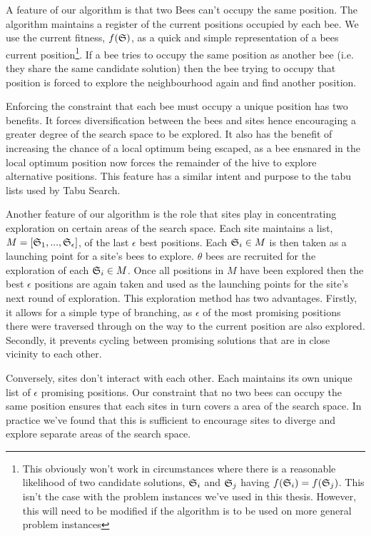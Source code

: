 
A feature of our algorithm is that two Bees can't occupy the same position. The algorithm maintains a register of the current positions occupied by each bee. We use the current fitness, $f(\mathfrak{S})$, as a quick and simple representation of a bees current position\footnote{This obviously won't work in circumstances where there is a reasonable likelihood of two candidate solutions, $\mathfrak{S}_i$ and $\mathfrak{S}_j$ having $f(\mathfrak{S}_i) = f(\mathfrak{S}_j)$. This isn't the case with the problem instances we've used in this thesis. However, this will need to be modified if the algorithm is to be used on more general problem instances}. If a bee tries to occupy the same position as another bee (i.e. they share the same candidate solution) then the bee trying to occupy that position is forced to explore the neighbourhood again and find another position. 

Enforcing the constraint that each bee must occupy a unique position has two benefits. It forces diversification between the bees and sites hence encouraging a greater degree of the search space to be explored. It also has the benefit of increasing the chance of a local optimum being escaped, as a bee ensnared in the local optimum position now forces the remainder of the hive to explore alternative positions. This feature has a similar intent and purpose to the tabu lists used by Tabu Search.

Another feature of our algorithm is the role that sites play in concentrating exploration on certain areas of the search space. Each site maintains a list, $M = [\mathfrak{S}_1,..., \mathfrak{S}_\epsilon]$, of the last $\epsilon$ best positions. Each $\mathfrak{S}_i \in M$ is then taken as a launching point for a site's bees to explore. $\theta$ bees are recruited for the exploration of each $\mathfrak{S}_i \in M$. Once all positions in $M$ have been explored then the best $\epsilon$ positions are again taken and used as the launching points for the site's next round of exploration. This exploration method has two advantages. Firstly, it allows for a simple type of branching, as $\epsilon$ of the most promising positions there were traversed through on the way to the current position are also explored. Secondly, it prevents cycling between promising solutions that are in close vicinity to each other.

Conversely, sites don't interact with each other. Each maintains its own unique list of $\epsilon$ promising positions. Our constraint that no two bees can occupy the same position ensures that each sites in turn covers a area of the search space. In practice we've found that this is sufficient to encourage sites to diverge and explore separate areas of the search space.    

